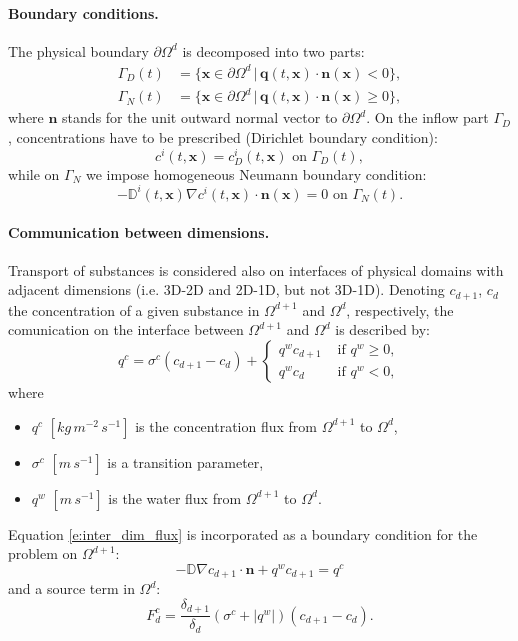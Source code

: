 \documentclass[a4paper]{article}
\def\abs#1{\lvert#1\rvert}
\def\D{{\tn D}}
\def\vc#1{\mathbf{\boldsymbol{#1}}}     %
\def\tn#1{{\mathbb{#1}}}    %
\def\where{\,|\,}
\begin{document}
\paragraph{Boundary conditions.}
The physical boundary $\partial\Omega^d$ is decomposed into two parts:
\begin{align*}
\Gamma_D(t) &= \{\vc x\in \partial\Omega^d\where \vc q(t,\vc x)\cdot\vc n(\vc x)<0\},\\
\Gamma_N(t) &= \{\vc x\in \partial\Omega^d\where \vc q(t,\vc x)\cdot\vc n(\vc x)\ge 0\},
\end{align*}
where $\vc n$ stands for the unit outward normal vector to $\partial\Omega^d$.
On the inflow part $\Gamma_D$, concentrations have to be prescribed (Dirichlet boundary condition):
$$ c^i(t,\vc x) = c^i_D(t,\vc x) \mbox{ on }\Gamma_D(t), $$
while on $\Gamma_N$ we impose homogeneous Neumann boundary condition:
$$ -\D^i(t,\vc x)\nabla c^i(t,\vc x)\cdot\vc n(\vc x) = 0 \mbox{ on }\Gamma_N(t). $$




\paragraph{Communication between dimensions.}
Transport of substances is considered also on interfaces of physical domains with adjacent dimensions (i.e. 3D-2D and 2D-1D, but not 3D-1D).
Denoting $c_{d+1}$, $c_d$ the concentration of a given substance in $\Omega^{d+1}$ and $\Omega^d$, respectively, the comunication on the interface between $\Omega^{d+1}$ and $\Omega^d$ is described by:
\begin{equation}
  \label{e:inter_dim_flux}
  q^c = \sigma^c (c_{d+1} - c_d) + \begin{cases}q^w c_{d+1} & \mbox{ if }q^w\ge 0,\\q^w c_d & \mbox{ if }q^w<0,\end{cases}
\end{equation}
where
\begin{itemize}
\item $q^c$ $[kg\, m^{-2}\,s^{-1}]$ is the concentration flux from $\Omega^{d+1}$ to $\Omega^d$,
\item $\sigma^c$ $[m\,s^{-1}]$ is a transition parameter,
\item $q^w$ $[m\,s^{-1}]$ is the water flux from $\Omega^{d+1}$ to $\Omega^d$.
\end{itemize}
Equation \eqref{e:inter_dim_flux} is incorporated as a boundary condition for the problem on $\Omega^{d+1}$:
$$ -\D\nabla c_{d+1}\cdot\vc n + q^w c_{d+1} = q^c $$
and a source term in $\Omega^d$:
$$ F^c_d = \frac{\delta_{d+1}}{\delta_d}(\sigma^c+\abs{q^w})(c_{d+1}-c_d). $$
\end{document}
